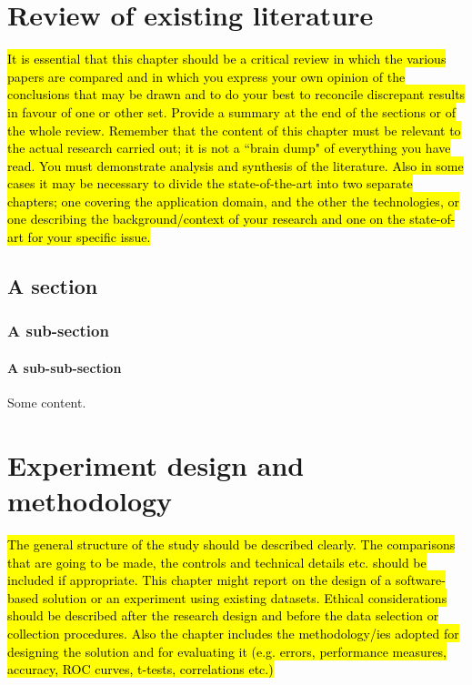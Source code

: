 \documentclass[oneside,12pt]{book}
\begin{document}
\chapter{Review of existing literature}
\hl{It is essential that this chapter should be a critical review in which the various papers are compared and in which you express your own opinion of the conclusions that may be drawn and to do your best to reconcile discrepant results in favour of one or other set. Provide a summary at the end of the sections or of the whole review. Remember that the content of this chapter must be relevant to the actual research carried out; it is not a ``brain dump" of everything you have read. You must demonstrate analysis and synthesis of the literature. Also in some cases it may be necessary to divide the state-of-the-art into two separate chapters; one covering the application domain, and the other the technologies, or one describing the background/context of your research and one on the state-of-art for your specific issue.}

\section{A section}

\subsection{A sub-section}

\subsubsection{A sub-sub-section}

\par Some content.


\chapter{Experiment design and methodology}
\hl{The general structure of the study should be described clearly. The comparisons that are going to be made, the controls and technical details etc. should be included if appropriate. This chapter might report on the design of a software-based solution or an experiment using existing datasets. Ethical considerations should be described after the research design and before the data selection or collection procedures. Also the chapter includes the methodology/ies adopted for designing the solution and for evaluating it (e.g. errors, performance measures, accuracy, ROC curves, t-tests, correlations etc.)}
\end{document}
